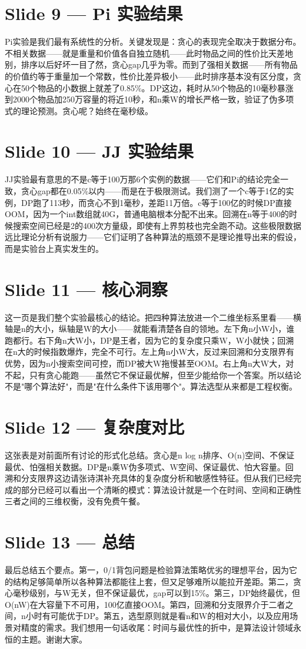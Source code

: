 \documentclass[12pt,a4paper]{ctexart}
\begin{document}
\section*{Slide 9 — Pi 实验结果}

Pi实验是我们最有系统性的分析。关键发现是：贪心的表现完全取决于数据分布。不相关数据——就是重量和价值各自独立随机——此时物品之间的性价比天差地别，排序以后好坏一目了然，贪心gap几乎为零。而到了强相关数据——所有物品的价值约等于重量加一个常数，性价比差异极小——此时排序基本没有区分度，贪心在50个物品的小数据上就差了0.85\%。DP这边，耗时从50个物品的10毫秒暴涨到2000个物品加250万容量的将近10秒，和n乘W的增长严格一致，验证了伪多项式的理论预测。贪心呢？始终在毫秒级。

\section*{Slide 10 — JJ 实验结果}

JJ实验最有意思的不是c等于100万那6个实例的数据——它们和Pi的结论完全一致，贪心gap都在0.05\%以内——而是在于极限测试。我们测了一个c等于1亿的实例，DP跑了113秒，而贪心不到1毫秒，差距11万倍。c等于100亿的时候DP直接OOM，因为一个int数组就40G，普通电脑根本分配不出来。回溯在n等于400的时候搜索空间已经是2的400次方量级，即使有上界剪枝也完全跑不动。这些极限数据远比理论分析有说服力——它们证明了各种算法的瓶颈不是理论推导出来的假设，而是实验台上真实发生的。

\section*{Slide 11 — 核心洞察}

这一页是我们整个实验最核心的结论。把四种算法放进一个二维坐标系里看——横轴是n的大小，纵轴是W的大小——就能看清楚各自的领地。左下角n小W小，谁跑都行。右下角n大W小，DP是王者，因为它的复杂度只乘W，W小就快；回溯在n大的时候指数爆炸，完全不可行。左上角n小W大，反过来回溯和分支限界有优势，因为n小搜索空间可控，而DP被大W拖慢甚至OOM。右上角n大W大，对不起，只有贪心能跑——虽然它不保证最优解，但至少能给你一个答案。所以结论不是"哪个算法好"，而是"在什么条件下该用哪个"。算法选型从来都是工程权衡。

\section*{Slide 12 — 复杂度对比}

这张表是对前面所有讨论的形式化总结。贪心是n log n排序、O(n)空间、不保证最优、怕强相关数据。DP是n乘W伪多项式、W空间、保证最优、怕大容量。回溯和分支限界这边请张诗淇补充具体的复杂度分析和敏感性特征。但从我们已经完成的部分已经可以看出一个清晰的模式：算法设计就是一个在时间、空间和正确性三者之间的三维权衡，没有免费午餐。

\section*{Slide 13 — 总结}

最后总结五个要点。第一，0/1背包问题是检验算法策略优劣的理想平台，因为它的结构足够简单所以各种算法都能往上套，但又足够难所以能拉开差距。第二，贪心毫秒级别，与W无关，但不保证最优，gap可以到15\%。第三，DP始终最优，但O(nW)在大容量下不可用，100亿直接OOM。第四，回溯和分支限界介于二者之间，n小时有可能优于DP。第五，选型原则就是看n和W的相对大小，以及应用场景对精度的需求。我们想用一句话收尾：时间与最优性的折中，是算法设计领域永恒的主题。谢谢大家。
\end{document}
